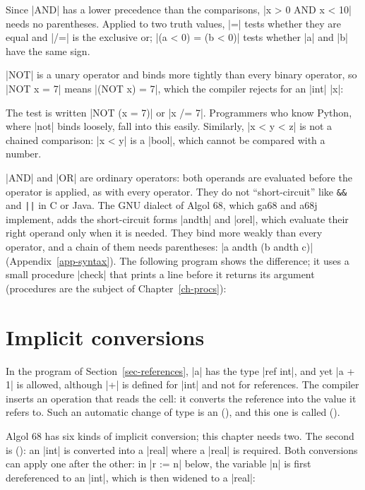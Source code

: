Since \code|AND| has a lower precedence than the comparisons,
\code|x > 0 AND x < 10| needs no parentheses. Applied to two truth
values, \code|=| tests whether they are equal and \code|/=| is the
exclusive or; \code|(a < 0) = (b < 0)| tests whether \code|a| and
\code|b| have the same sign.

\begin{pitfall}
\code|NOT| is a unary operator and binds more tightly than every binary
operator, so \code|NOT x = 7| means \code|(NOT x) = 7|, which the
compiler rejects for an \code|int| \code|x|:

\noindent The test is written \code|NOT (x = 7)| or \code|x /= 7|.
Programmers who know Python, where \code|not| binds loosely, fall into
this easily. Similarly, \code|x < y < z| is not a chained comparison:
\code|x < y| is a \code|bool|, which cannot be compared with a number.
\end{pitfall}

\code|AND| and \code|OR| are ordinary operators: both operands are
evaluated before the operator is applied, as with every operator. They do
not ``short-circuit'' like \texttt{\&\&} and \texttt{||} in C or Java. The
GNU dialect of Algol 68, which ga68 and a68j implement, adds the
short-circuit forms \code|andth| and \code|orel|, which evaluate their
right operand only when it is needed. They bind more weakly than every
operator, and a chain of them needs parentheses:
\code|a andth (b andth c)| (Appendix~\ref{app-syntax}). The following program shows the
difference; it uses a small procedure \code|check| that prints a line
before it returns its argument (procedures are the subject of
Chapter~\ref{ch-procs}):


\section{Implicit conversions}\label{sec-coercions}

In the program of Section~\ref{sec-references}, \code|a| has the type
\code|ref int|, and yet \code|a + 1| is allowed, although \code|+| is
defined for \code|int| and not for references. The compiler inserts an
operation that reads the cell: it converts the reference into the value it
refers to. Such an automatic change of type is an  (), and this one is called
 ().

Algol 68 has six kinds of implicit conversion; this chapter needs two.
The second is  (): an \code|int| is
converted into a \code|real| where a \code|real| is required. Both
conversions can apply one after the other: in \code|r := n| below, the
variable \code|n| is first dereferenced to an \code|int|, which is then
widened to a \code|real|:

